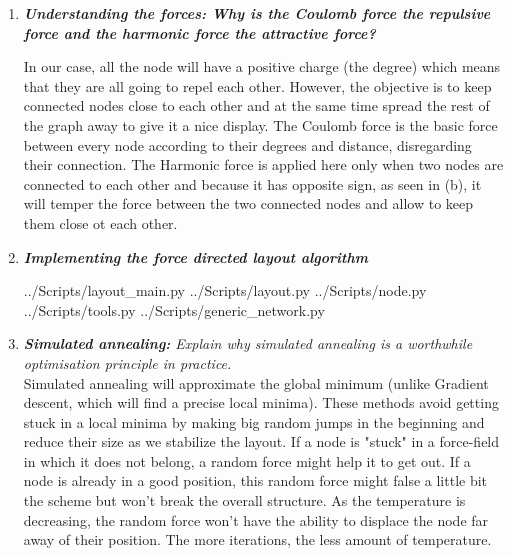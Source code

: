 \documentclass[10pt,a4paper]{article}
\begin{document}
\begin{enumerate}
	
	\item \textit{\textbf{\textbf{Understanding the forces:} Why is the Coulomb force the repulsive force and the harmonic force the attractive force?}}
		
		In our case, all the node will have a positive charge (the degree) which means that they are all going to repel each other. However, the objective is to keep connected nodes close to each other and at the same time spread the rest of the graph away to give it a nice display. The Coulomb force is the basic force between every node according to their degrees and distance, disregarding their connection. The Harmonic force is applied here only when two nodes are connected to each other and because it has opposite sign, as seen in (b), it will temper the force between the two connected nodes and allow to keep them close ot each other.  
		
	
	
	\newpage
	\item \textit{\textbf{Implementing the force directed layout algorithm}}
	
		 {../Scripts/layout\string_main.py}
		 {../Scripts/layout.py}
		 {../Scripts/node.py}
		 {../Scripts/tools.py}
		 {../Scripts/generic\string_network.py}
		
		
		
		
	
	\newpage
	\item \textit{\textbf{Simulated annealing:} Explain why simulated annealing is a worthwhile optimisation principle in practice.}\\
	Simulated annealing will approximate the global minimum (unlike Gradient descent, which will find a precise local minima). These methods avoid getting stuck in a local minima by making big random jumps in the beginning and reduce their size as we stabilize the layout. If a node is "stuck" in a force-field in which it does not belong, a random force might help it to get out. If a node is already in a good position, this random force might false a little bit the scheme but won't break the overall structure. As the temperature is decreasing, the random force won't have the ability to displace the node far away of their position. The more iterations, the less amount of temperature. \\
	

\end{enumerate}
\end{document}
